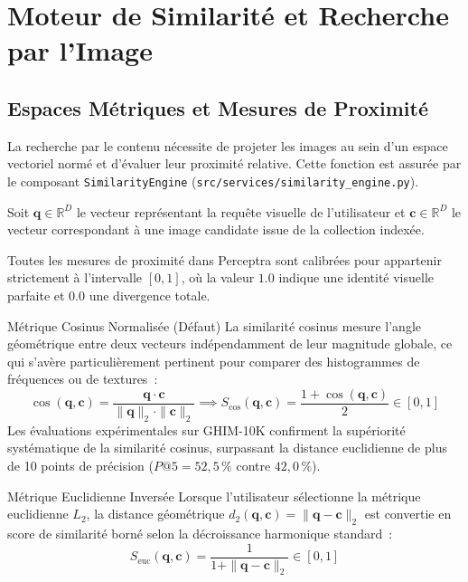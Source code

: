 \chapter{Moteur de Similarité et Recherche par l'Image}
\label{chap:recherche}

\section{Espaces Métriques et Mesures de Proximité}

La recherche par le contenu nécessite de projeter les images au sein d'un espace vectoriel normé et d'évaluer leur proximité relative. Cette fonction est assurée par le composant \texttt{SimilarityEngine} (\texttt{src/services/similarity\_engine.py}).

Soit $\mathbf{q} \in \mathbb{R}^D$ le vecteur représentant la requête visuelle de l'utilisateur et $\mathbf{c} \in \mathbb{R}^D$ le vecteur correspondant à une image candidate issue de la collection indexée.

Toutes les mesures de proximité dans Perceptra sont calibrées pour appartenir strictement à l'intervalle $[0, 1]$, où la valeur $1.0$ indique une identité visuelle parfaite et $0.0$ une divergence totale.

\begin{infobox}{Métrique Cosinus Normalisée (Défaut)}
La similarité cosinus mesure l'angle géométrique entre deux vecteurs indépendamment de leur magnitude globale, ce qui s'avère particulièrement pertinent pour comparer des histogrammes de fréquences ou de textures~:
\begin{equation}
\cos(\mathbf{q}, \mathbf{c}) = \frac{\mathbf{q} \cdot \mathbf{c}}{\|\mathbf{q}\|_2 \cdot \|\mathbf{c}\|_2} \implies S_{\text{cos}}(\mathbf{q}, \mathbf{c}) = \frac{1 + \cos(\mathbf{q}, \mathbf{c})}{2} \in [0, 1]
\end{equation}
Les évaluations expérimentales sur GHIM-10K confirment la supériorité systématique de la similarité cosinus, surpassant la distance euclidienne de plus de 10 points de précision ($P@5 = 52,5\,\%$ contre $42,0\,\%$).
\end{infobox}

\begin{infobox}{Métrique Euclidienne Inversée}
Lorsque l'utilisateur sélectionne la métrique euclidienne $L_2$, la distance géométrique $d_2(\mathbf{q}, \mathbf{c}) = \|\mathbf{q} - \mathbf{c}\|_2$ est convertie en score de similarité borné selon la décroissance harmonique standard~:
\begin{equation}
S_{\text{euc}}(\mathbf{q}, \mathbf{c}) = \frac{1}{1 + \|\mathbf{q} - \mathbf{c}\|_2} \in [0, 1]
\end{equation}
\end{infobox}

